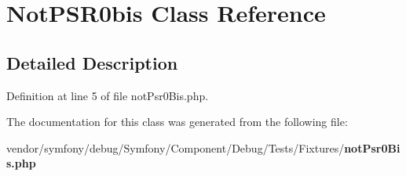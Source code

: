 \section{Not\+P\+S\+R0bis Class Reference}
\label{class_symfony_1_1_component_1_1_debug_1_1_tests_1_1_fixtures_1_1_not_p_s_r0bis}


\subsection{Detailed Description}


Definition at line 5 of file not\+Psr0\+Bis.\+php.



The documentation for this class was generated from the following file\+:\begin{DoxyCompactItemize}
\item 
vendor/symfony/debug/\+Symfony/\+Component/\+Debug/\+Tests/\+Fixtures/{\bf not\+Psr0\+Bis.\+php}\end{DoxyCompactItemize}
